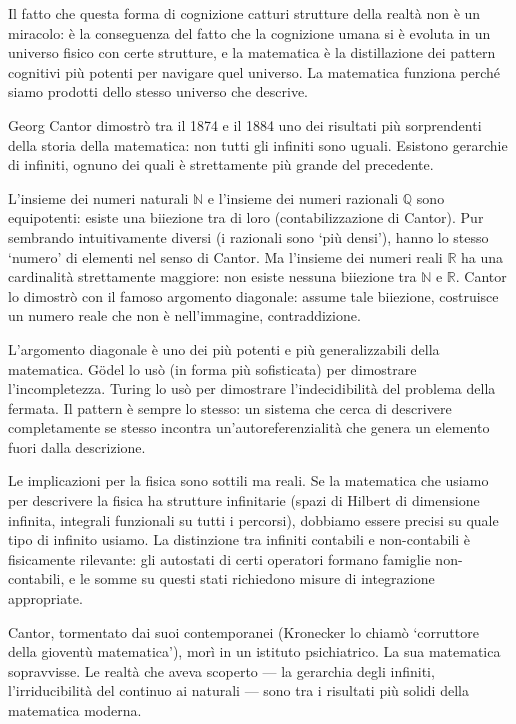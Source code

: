 \documentclass[12pt,a4paper,openany]{book}
\newcommand{\sezione}[1]{\vspace{1.2em}{\large\bfseries #1}\vspace{0.5em}\par}
\begin{document}
Il fatto che questa forma di cognizione catturi strutture della realtà non è un miracolo: è la conseguenza del fatto che la cognizione umana si è evoluta in un universo fisico con certe strutture, e la matematica è la distillazione dei pattern cognitivi più potenti per navigare quel universo. La matematica funziona perché siamo prodotti dello stesso universo che descrive.

\sezione{La matematica dei infiniti: Cantor e le gerarchie dell'infinito}

Georg Cantor dimostrò tra il 1874 e il 1884 uno dei risultati più sorprendenti della storia della matematica: non tutti gli infiniti sono uguali. Esistono gerarchie di infiniti, ognuno dei quali è strettamente più grande del precedente.

L'insieme dei numeri naturali $\mathbb{N}$ e l'insieme dei numeri razionali $\mathbb{Q}$ sono equipotenti: esiste una biiezione tra di loro (contabilizzazione di Cantor). Pur sembrando intuitivamente diversi (i razionali sono `più densi'), hanno lo stesso `numero' di elementi nel senso di Cantor. Ma l'insieme dei numeri reali $\mathbb{R}$ ha una cardinalità strettamente maggiore: non esiste nessuna biiezione tra $\mathbb{N}$ e $\mathbb{R}$. Cantor lo dimostrò con il famoso argomento diagonale: assume tale biiezione, costruisce un numero reale che non è nell'immagine, contraddizione.

L'argomento diagonale è uno dei più potenti e più generalizzabili della matematica. Gödel lo usò (in forma più sofisticata) per dimostrare l'incompletezza. Turing lo usò per dimostrare l'indecidibilità del problema della fermata. Il pattern è sempre lo stesso: un sistema che cerca di descrivere completamente se stesso incontra un'autoreferenzialità che genera un elemento fuori dalla descrizione.

Le implicazioni per la fisica sono sottili ma reali. Se la matematica che usiamo per descrivere la fisica ha strutture infinitarie (spazi di Hilbert di dimensione infinita, integrali funzionali su tutti i percorsi), dobbiamo essere precisi su quale tipo di infinito usiamo. La distinzione tra infiniti contabili e non-contabili è fisicamente rilevante: gli autostati di certi operatori formano famiglie non-contabili, e le somme su questi stati richiedono misure di integrazione appropriate.

Cantor, tormentato dai suoi contemporanei (Kronecker lo chiamò `corruttore della gioventù matematica'), morì in un istituto psichiatrico. La sua matematica sopravvisse. Le realtà che aveva scoperto --- la gerarchia degli infiniti, l'irriducibilità del continuo ai naturali --- sono tra i risultati più solidi della matematica moderna.
\end{document}
